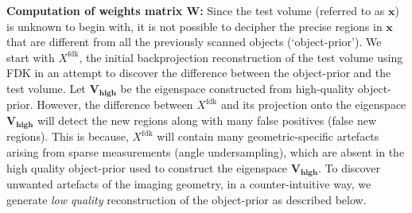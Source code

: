 \documentclass[journal]{IEEEtran}
\begin{document}
\textbf{Computation of weights matrix $\boldsymbol{W}$:}
Since the test volume (referred to as $\boldsymbol{x}$) is unknown to
begin with, it is not possible to decipher the precise regions in
$\boldsymbol{x}$ that are different from all the previously scanned
objects (`object-prior'). We start with $X^{\text{fdk}}$, the initial
backprojection reconstruction of the test volume using FDK in an attempt to
discover the difference between the object-prior and the test
volume. Let $\boldsymbol{V_{\text{high}}}$ be the eigenspace
constructed from high-quality object-prior. However, the difference
between $X^{\text{fdk}}$ and its projection onto the eigenspace
$\boldsymbol{V_{\text{high}}}$ will detect the new regions along with
many false positives (false new regions). This is because,
$X^{\text{fdk}}$ will contain many geometric-specific artefacts
arising from sparse measurements (angle undersampling), which are
absent in the high quality object-prior used to construct the
eigenspace $\boldsymbol{V_{\text{high}}}$. To discover unwanted
artefacts of the imaging geometry, in a counter-intuitive way, we
generate \emph{low quality} reconstruction of the object-prior as
described below.
\\
\end{document}
